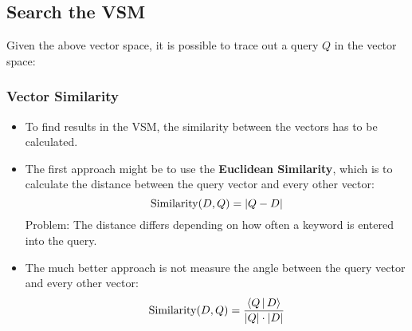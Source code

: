         \subsection{Search the VSM} %
       		Given the above vector space, it is possible to trace out a query \(Q\) in the vector space:
       		\begin{figure}[H]
       			\centering
       		\end{figure}
       	
       		\subsubsection{Vector Similarity} %
       			\begin{itemize}
       				\item To find results in the VSM, the similarity between the vectors has to be calculated.
       				\item The first approach might be to use the \textbf{Euclidean Similarity}, which is to calculate the distance between the query vector and every other vector:
       					\begin{equation*}
           					\text{Similarity}(D, Q) = \abs{Q - D}
       					\end{equation*}
       					Problem: The distance differs depending on how often a keyword is entered into the query.
       				\item The much better approach is not measure the angle between the query vector and every other vector:
       					\begin{equation*}
           					\text{Similarity}(D, Q) = \frac{\langle Q \,\vert\, D \rangle}{\abs{Q} \cdot \abs{D}}
       					\end{equation*}
       			\end{itemize}

